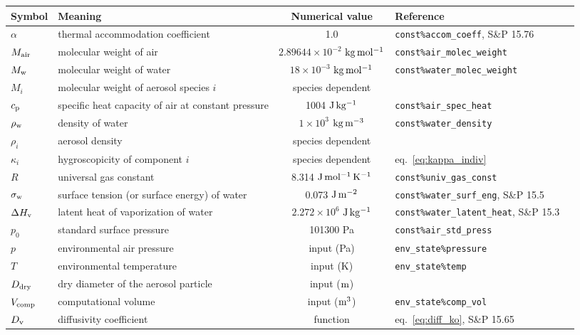 \documentclass{article}
\begin{document}
\vspace{2cm}
\begin{tabular}{lp{4cm}clp{3cm}}
\hline Symbol & Meaning  & Numerical value &  Reference    \\
\hline             
$\alpha$   &  thermal accommodation coefficient    & 1.0 & \verb+const%accom_coeff+, S\&P 15.76 \\
$M_{\rm air} $      &  molecular weight of air      & $2.89644 \times 10^{-2} $  $\rm{kg \,mol^{-1}}$ &  \verb+const%air_molec_weight+   \\
$M_{\rm w} $    &  molecular weight of water        & $18\times10^{-3}$ $\rm{kg \, mol^{-1}}  $  &  \verb+const%water_molec_weight+    \\
$M_i $      &  molecular weight of aerosol species $i$  & species dependent &    \\
$c_{\rm p}$       &  specific heat capacity of air at constant pressure  & 1004 $\rm{J \, kg^{-1}}$ & \verb+const%air_spec_heat+     \\
$\rho_{\rm w}$ &  density of water & $1\times10^{3}$ $\rm{kg \, m^{-3}}  $ &   \verb+const%water_density+ \\ 
$ \rho_i$    &  aerosol density   & species dependent  &     \\
$\kappa_i$      &  hygroscopicity of component $i$   & species dependent  &  eq.~\ref{eq:kappa_indiv}   \\
$R$     &  universal gas constant  & 8.314 $\rm{J \, mol^{-1}\, K^{-1}}$   &  \verb+const%univ_gas_const+ \\
$\sigma_{\rm w}$     &  surface tension (or surface energy) of water  & 0.073 $\rm{J \, m^{-2}}$ & \verb+const%water_surf_eng+, S\&P 15.5  \\
$\Delta H_{\rm  v}$  & latent heat of vaporization of water   & $2.272\times10^{6}$ $\rm{J \, kg^{-1}}$ & \verb+const%water_latent_heat+, S\&P 15.3 \\ 
$p_0$ & standard surface pressure &  101300 Pa & \verb+const%air_std_press+ \\
$p$     &  environmental air pressure & input  (Pa) &  \verb+env_state%pressure+ \\
$T$     &  environmental temperature  & input  (K) &  \verb+env_state%temp+  \\
$D_{\rm dry}$       & dry diameter of the aerosol particle   & input ($\rm m$) &    \\
$V_{\rm comp}$ & computational volume & input ($\rm m^3$) & \verb+env_state%comp_vol+\\
\hline
$D_{\rm v}$     & diffusivity coefficient   &  function &eq.~\ref{eq:diff_ko}, S\&P 15.65  \\

\end{tabular}
\end{document}
